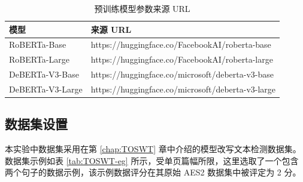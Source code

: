 \begin{table}[htbp]
\centering
\caption{预训练模型参数来源 URL} \label{tab:method-pretrain_model_url}
\begin{tabular}{ll}
\toprule
\textbf{模型}      & \textbf{来源 URL}                                                                 \\ \midrule
RoBERTa-Base \cite{liu_roberta_2019}     & https://huggingface.co/FacebookAI/roberta-base    \\
RoBERTa-Large \cite{liu_roberta_2019}   & https://huggingface.co/FacebookAI/roberta-large   \\
DeBERTa-V3-Base \cite{he2023debertav3improvingdebertausing}  & https://huggingface.co/microsoft/deberta-v3-base  \\
DeBERTa-V3-Large \cite{he2023debertav3improvingdebertausing} & https://huggingface.co/microsoft/deberta-v3-large \\ \bottomrule
\end{tabular}
\end{table}


\subsection{数据集设置}
\label{sec:method-experiment-dataset}

本实验中数据集采用在第 \ref{chap:TOSWT} 章中介绍的模型改写文本检测数据集。数据集示例如表 \ref{tab:TOSWT-eg} 所示，受单页篇幅所限，这里选取了一个包含两个句子的数据示例，该示例数据评分在其原始 AES2 数据集中被评定为 2 分。

